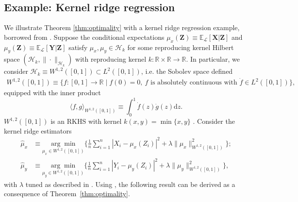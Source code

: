 \documentclass[aos]{imsart}
\theoremstyle{plain}
\theoremstyle{remark}
\newcommand{\E}{\mathbb E}								%
\newcommand{\argmin}[1]{\underset{#1}{\arg \min}}       %
\newcommand{\prx}{\bm X}								%
\newcommand{\prz}{\bm Z}								%
\newcommand{\pry}{{\bm Y}}								%
\newcommand{\law}{\mathcal L}							%
\renewcommand{\H}{\mathcal H}		 					%
\begin{document}
\subsection{Example: Kernel ridge regression} \label{sec:kernel-ridge-regression}
We illustrate Theorem \ref{thm:optimality} with a kernel ridge regression example, borrowed from \citet[Section 4]{Shah2018}. Suppose the conditional expectations $\mu_x(\prz) \equiv \E_{\law}[\prx|\prz]$ and $\mu_y(\prz) \equiv \E_{\law}[\pry|\prz]$ satisfy $\mu_x, \mu_y \in \H_k$ for some reproducing kernel Hilbert space $(\H_k,\|\cdot\|_{\H_k})$ with reproducing kernel $k:\mathbb{R}\times\mathbb{R}\rightarrow\mathbb{R}$. In particular, we consider $\H_k \equiv W^{1,2}([0,1]) \subset L^2([0,1])$, i.e. the Sobolev space defined 
\begin{align*}
    W^{1,2}([0,1]) \equiv \big\{f:[0,1]\rightarrow \mathbb{R} \mid f(0)=0,\ f \text{ is absolutely continuous with } \dot{f}\in L^2([0,1])\big\},
\end{align*} 
equipped with the inner product
\begin{equation*}
    \langle f,g\rangle_{W^{1,2}([0,1])} \equiv \int_0^1\dot{f}(z)\dot{g}(z)\mathrm{d}z.
\end{equation*}
$W^{1,2}([0,1])$ is an RKHS with kernel $k(x,y)=\min\{x,y\}$ \citep[Example 12.16]{Wainwright2019}. Consider the kernel ridge estimators
\begin{equation}
    \begin{split}
        \widehat \mu_x &\equiv \argmin{\mu_x \in W^{1,2}([0,1])}\bigg\{\frac{1}{n}\sum_{i=1}^n|X_i-\mu_x(Z_i)|^2+\lambda\|\mu_x\|_{W^{1,2}([0,1])}^2\bigg\};\\ 
        \widehat \mu_y &\equiv \argmin{\mu_y \in W^{1,2}([0,1])}\bigg\{\frac{1}{n}\sum_{i=1}^n|Y_i-\mu_y(Z_i)|^2+\lambda\|\mu_y\|_{W^{1,2}([0,1])}^2\bigg\},
        \label{eq:kernel-ridge-estimators}
    \end{split}
\end{equation}
with $\lambda$ tuned as described in \citet[Section 4]{Shah2018}. Using \citet[Theorem 11]{Shah2018}, the following result can be derived as a consequence of Theorem~\ref{thm:optimality}.
\end{document}
